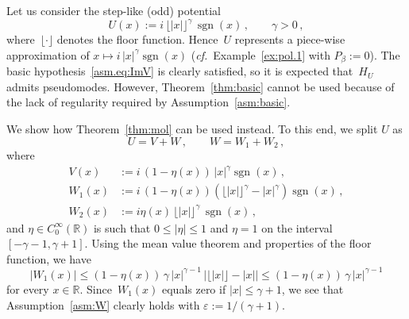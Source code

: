 \begin{Example}
Let us consider the step-like (odd) potential 
\begin{equation} 
 U(x) := i \, \lfloor |x| \rfloor^\gamma \, {\mathop{\mathrm{sgn}}\nolimits}(x)\,,
  \qquad
  \gamma >0  
  \,,
\end{equation}
where~$\lfloor \cdot \rfloor$ denotes the floor function.
Hence~$U$ represents a piece-wise approximation of 
$x \mapsto i \, |x|^\gamma {\mathop{\mathrm{sgn}}\nolimits}(x)$ 
({\emph{cf.}}~Example~\ref{ex:pol.1} with $P_\beta:=0$).
The basic hypothesis~\eqref{asm.eq:ImV} is clearly satisfied,
so it is expected that~$H_U$ admits pseudomodes.
However, Theorem~\ref{thm:basic} cannot be used because
of the lack of regularity required by Assumption~\ref{asm:basic}.

We show how Theorem~\ref{thm:mol} can be used instead. To this end, 
we split $U$ as
\begin{equation} 
  U = V + W \,,
  \qquad  
  W = W_1 + W_2
  \,,
\end{equation}
where
\begin{equation}
\begin{aligned}
  V(x) &:= i \, (1-\eta(x)) \, |x|^\gamma {\mathop{\mathrm{sgn}}\nolimits}(x) 
  \,, \\
  W_1(x) &:= i \, (1-\eta(x)) 
  \left( \lfloor |x| \rfloor^\gamma - |x|^\gamma \right) 
  {\mathop{\mathrm{sgn}}\nolimits}(x)
  \,, \\
  W_2(x) &:= i \eta(x) \, \lfloor |x| \rfloor^\gamma \, {\mathop{\mathrm{sgn}}\nolimits}(x)
  \,,
\end{aligned}
\end{equation}
and $\eta \in C_0^\infty({\mathbb{R}})$ is such that $0 \leq |\eta| \leq 1$
and $\eta=1$ on the interval $[-\gamma-1,\gamma+1]$.
Using the mean value theorem and properties of the floor function, 
we have
\begin{equation} 
  |W_1(x)| 
  \leq (1-\eta(x)) \,
  \gamma \, |x|^{\gamma-1} \, \big| \lfloor |x| \rfloor - |x| \big|
  \leq (1-\eta(x)) \,
  \gamma \, |x|^{\gamma-1} 
  
  
\end{equation}
for every $x\in{\mathbb{R}}$.
Since~$W_1(x)$ equals zero if $|x| \leq \gamma+1$,
we see that Assumption~\ref{asm:W} clearly holds with ${\varepsilon}:=1/(\gamma+1)$.


\end{Example}
